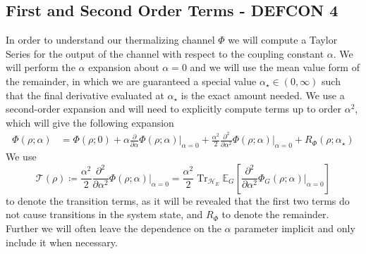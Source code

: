 \documentclass{article}
\DeclareMathOperator{\Tr}{Tr}
\newcommand{\hilb}{\mathcal{H}}
\begin{document}
\subsection{First and Second Order Terms - DEFCON 4}
In order to understand our thermalizing channel $\Phi$ we will compute a Taylor Series for the output of the channel with respect to the coupling constant $\alpha$. We will perform the $\alpha$ expansion about $\alpha = 0$ and we will use the mean value form of the remainder, in which we are guaranteed a special value $\alpha_{\star} \in (0, \infty)$ such that the final derivative evaluated at $\alpha_{\star}$ is the exact amount needed. We use a second-order expansion and will need to explicitly compute terms up to order $\alpha^2$, which will give the following expansion
\begin{align}
    \Phi(\rho; \alpha) &= \Phi(\rho; 0) + \alpha \frac{\partial}{\partial \alpha} \Phi(\rho; \alpha) \big|_{\alpha = 0} + \frac{\alpha^2}{2} \frac{\partial^2}{\partial \alpha^2} \Phi(\rho; \alpha) \big|_{\alpha = 0} + R_{\Phi}(\rho; \alpha_{\star}) \label{eq:phi_taylor_series}
\end{align}
We use
\begin{equation}
    \mathcal{T}(\rho) \coloneqq \frac{\alpha^2}{2} \frac{\partial^2}{\partial \alpha^2} \Phi(\rho; \alpha) \bigg|_{\alpha = 0} = \frac{\alpha^2}{2}  \Tr_{\hilb_E} \mathbb{E}_{G} \left[\frac{\partial^2}{\partial \alpha^2} \Phi_G(\rho; \alpha) \big|_{\alpha = 0}\right] \label{eq:transition_def}
\end{equation} to denote the transition terms, as it will be revealed that the first two terms do not cause transitions in the system state, and $R_{\Phi}$ to denote the remainder. 
Further we will often leave the dependence on the  $\alpha$ parameter implicit and only include it when necessary.
\end{document}
